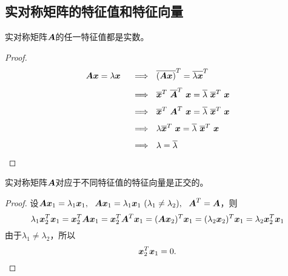 \subsection{实对称矩阵的特征值和特征向量}

\begin{frame}
  \begin{dingli}
      实对称矩阵$\boldsymbol{A}$的任一特征值都是实数。
    \end{dingli}
    \pause
    \begin{proof}
    $$
    \begin{array}{rl}
      \boldsymbol{A}{\boldsymbol{x}} = \lambda {\boldsymbol{x}}
      &~~\Longrightarrow~~
      \overline{(\boldsymbol{A}{\boldsymbol{x}})}^T = \overline{\lambda {\boldsymbol{x}}}^T\\[0.1in]
      &~~\Longrightarrow~~
      \overline{{\boldsymbol{x}}}^T~\overline{\boldsymbol{A}}^T~{\boldsymbol{x}} = \overline{\lambda} ~\overline{{\boldsymbol{x}}}^T~{\boldsymbol{x}}\\[0.1in]
      &~~\Longrightarrow~~
      \overline{{\boldsymbol{x}}}^T~\boldsymbol{A}^T~{\boldsymbol{x}} = \overline{\lambda} ~\overline{{\boldsymbol{x}}}^T~{\boldsymbol{x}}\\[0.1in]
      &~~\Longrightarrow~~
      \lambda \overline{{\boldsymbol{x}}}^T~{\boldsymbol{x}} = \overline{\lambda} ~\overline{{\boldsymbol{x}}}^T~{\boldsymbol{x}}\\[0.1in]
      &~~\Longrightarrow~~
      \lambda = \overline \lambda
    \end{array}
    $$
  \end{proof}
\end{frame}


\begin{frame}
  
    \begin{dingli}
      实对称矩阵$\boldsymbol{A}$对应于不同特征值的特征向量是正交的。
    \end{dingli}
    \pause
    \begin{proof}
    设$\boldsymbol{A}{\boldsymbol{x}}_1=\lambda_1{\boldsymbol{x}}_1,~~\boldsymbol{A}{\boldsymbol{x}}_1=\lambda_1{\boldsymbol{x}}_1~ (\lambda_1\ne\lambda_2), ~~\boldsymbol{A}^T=\boldsymbol{A}$，则
    $$
    \lambda_1{\boldsymbol{x}}_2^T{\boldsymbol{x}}_1={\boldsymbol{x}}_2^T\boldsymbol{A}{\boldsymbol{x}}_1={\boldsymbol{x}}_2^T\boldsymbol{A}^T{\boldsymbol{x}}_1=(\boldsymbol{A}{\boldsymbol{x}}_2)^T{\boldsymbol{x}}_1=(\lambda_2{\boldsymbol{x}}_2)^T{\boldsymbol{x}}_1=\lambda_2{\boldsymbol{x}}_2^T{\boldsymbol{x}}_1
    $$\pause
    由于$\lambda_1\ne\lambda_2$，所以
    $$
    {\boldsymbol{x}}_2^T{\boldsymbol{x}}_1=0.
    $$
  \end{proof}
\end{frame}
